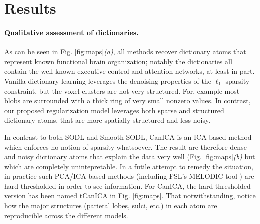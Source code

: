 \section{Results}
\label{sec:results}
\paragraph{Qualitative assessment of dictionaries.}
As can be seen in Fig. \ref{fig:maps}\textit{(a)}, all methods recover
dictionary atoms that represent known functional brain organization;
notably the dictionaries all
contain the well-known executive control and attention networks, at least
in part. Vanilla dictionary-learning leverages the denoising properties
of the $\ell_1$ sparsity constraint, but the voxel clusters are not very structured. For, example most blobs are surrounded with a thick ring of very small nonzero values.  In contrast, our proposed regularization model leverages both sparse and structured dictionary atoms, that are more spatially structured and less noisy.

In contrast to both SODL and Smooth-SODL, CanICA   \citep{varoquaux2010group} is an ICA-based method which enforces no notion of sparsity whatsoever. The result are therefore dense and noisy dictionary atoms that explain the data very well (Fig. \ref{fig:maps}\textit{(b)} but which are completely unintepretable. In a futile attempt to remedy the situation, in practice such PCA/ICA-based methods (including FSL's MELODIC tool   \citep{smith2004advances}) are hard-thresholded in order to see information. For CanICA, the hard-thresholded version has been named tCanICA in Fig. \ref{fig:maps}.
That notwithstanding, notice how the major structures (parietal lobes, sulci, etc.) in each atom are reproducible across the different models.

